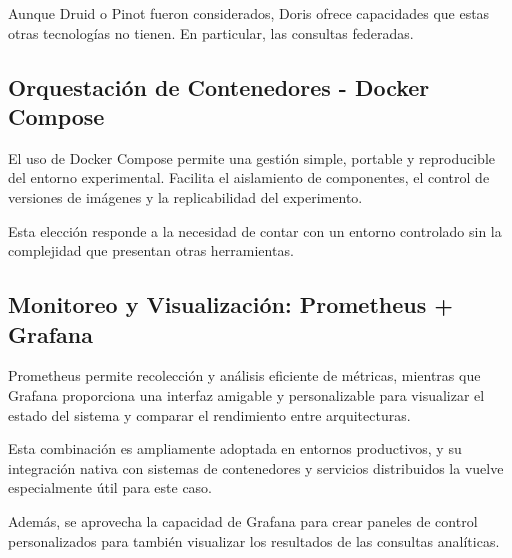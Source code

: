 Aunque Druid o Pinot fueron considerados, 
Doris ofrece capacidades que estas otras tecnologías no tienen. En particular, las consultas federadas.

\subsection*{Orquestación de Contenedores - Docker Compose}

El uso de Docker Compose permite una gestión simple, portable y reproducible del entorno experimental. 
Facilita el aislamiento de componentes, el control de versiones de imágenes y la replicabilidad del experimento. \newline

Esta elección responde a la necesidad de contar con un entorno controlado sin la complejidad que presentan otras herramientas.

\subsection*{Monitoreo y Visualización: Prometheus + Grafana}

Prometheus permite recolección y análisis eficiente de métricas, 
mientras que Grafana proporciona una interfaz amigable y personalizable para visualizar el estado del sistema y comparar el rendimiento entre arquitecturas. 

Esta combinación es ampliamente adoptada en entornos productivos, y su integración nativa con sistemas de contenedores y servicios distribuidos la vuelve especialmente útil para este caso.

Además, se aprovecha la capacidad de Grafana para crear paneles de control personalizados 
para también visualizar los resultados de las consultas analíticas.

\newpage
